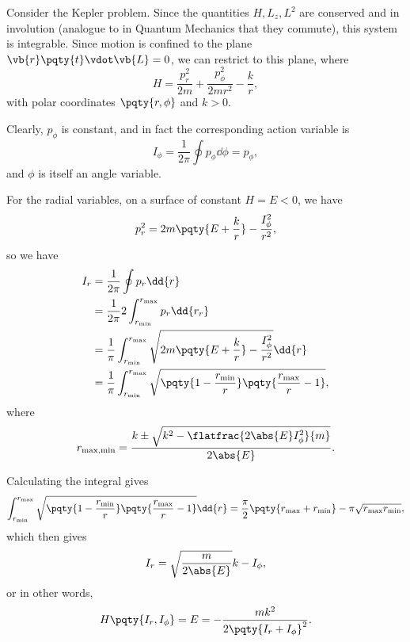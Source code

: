 \begin{example}
    Consider the Kepler problem. Since the quantities \(H, L_z, L^2\) are conserved and in involution (analogue to in Quantum Mechanics that they commute), this system is integrable. Since motion is confined to the plane \(\vb{r}\pqty{t} \vdot \vb{L} = 0\), we can restrict to this plane, where
    \begin{equation}
        H = \frac{p_r^2}{2m} + \frac{p_{\phi}^2}{2 m r^2} - \frac{k}{r},
    \end{equation}
    with polar coordinates \(\pqty{r, \phi}\) and \(k > 0\).

    Clearly, \(p_{\phi}\) is constant, and in fact the corresponding action variable is
    \begin{equation}
        I_{\phi} = \frac{1}{2\pi} \oint p_{\phi} \dd{\phi} = p_{\phi},
    \end{equation}
    and \(\phi\) is itself an angle variable.

    For the radial variables, on a surface of constant \(H = E < 0\), we have
    \begin{equation}
        p_r^2 = 2m \pqty{E + \frac{k}{r}} - \frac{I_\phi^2}{r^2},
    \end{equation}
    so we have
    \begin{subequations}
        \begin{align}
            I_r &= \frac{1}{2\pi} \oint p_r \dd{r} \\
            &= \frac{1}{2\pi} 2 \int_{r_{\text{min}}}^{r_{\text{max}}} p_r \dd{r_r} \\
            &= \frac{1}{\pi} \int_{r_{\text{min}}}^{r_{\text{max}}} \sqrt{2m \pqty{E + \frac{k}{r}} - \frac{I_\phi^2}{r^2}} \dd{r} \\
            &= \frac{1}{\pi} \int_{r_{\text{min}}}^{r_{\text{max}}} \sqrt{\pqty{1 - \frac{r_{\text{min}}}{r}} \pqty{\frac{r_{\text{max}}}{r} - 1}},
        \end{align}
    \end{subequations}
    where
    \begin{equation}
        r_{\text{max}, \text{min}} = \frac{k \pm \sqrt{k^2 - \flatfrac{2 \abs{E} I_\phi^2}{m}}}{2 \abs{E}}.
    \end{equation}

    Calculating the integral gives
    \begin{equation}
        \int_{r_{\text{min}}}^{r_{\text{max}}} \sqrt{\pqty{1 - \frac{r_{\text{min}}}{r}} \pqty{\frac{r_{\text{max}}}{r} - 1}} \dd{r} = \frac{\pi}{2} \pqty{r_{\text{max}} + r_{\text{min}}} - \pi \sqrt{r_{\text{max}} r_{\text{min}}},
    \end{equation}
    which then gives
    \begin{equation}
        I_r = \sqrt{\frac{m}{2 \abs{E}}} k - I_{\phi},
    \end{equation}
    or in other words,
    \begin{equation}
        H\pqty{I_r, I_{\phi}} = E = - \frac{m k^2}{2 \pqty{I_r + I_{\phi}}^2}.
    \end{equation}


\end{example}
